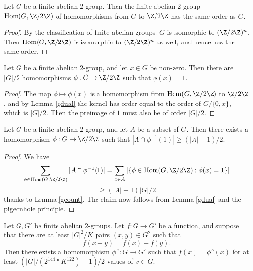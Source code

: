 \begin{lemma}[Duality]\label{gdual}\leanok Let $G$ be a finite abelian $2$-group.  Then the finite abelian $2$-group $\mathrm{Hom}(G,\Z/2\Z)$ of homomorphisms from $G$ to $\Z/2\Z$ has the same order as $G$.
\end{lemma}

\begin{proof}\leanok By the classification of finite abelian groups, $G$ is isomorphic to $(\Z/2\Z)^n$.  Then $\mathrm{Hom}(G,\Z/2\Z)$ is isomorphic to $(\Z/2\Z)^n$ as well, and hence has the same order.
\end{proof}

\begin{lemma}[Counting]\label{gcount}\leanok Let $G$ be a finite abelian $2$-group, and let $x \in G$ be non-zero.  Then there are $|G|/2$ homomorphisms $\phi: G \to \Z/2\Z$ such that $\phi(x) = 1$.
\end{lemma}

\begin{proof} \leanok The map $\phi \mapsto \phi(x)$ is a homomorphism from $\mathrm{Hom}(G,\Z/2\Z)$ to $\Z/2\Z$, and by Lemma \ref{gdual} the kernel has order equal to the order of $G / \{0,x\}$, which is $|G|/2$.  Then the preimage of $1$ must also be of order $|G|/2$.
\end{proof}

\begin{lemma}[Slicing]\label{gslice}\leanok  Let $G$ be a finite abelian $2$-group, and let $A$ be a subset of $G$.  Then there exists a homomorphism $\phi: G \to \Z/2\Z$ such that $|A \cap \phi^{-1}(1)| \geq (|A|-1)/2$.
\end{lemma}

\begin{proof}\leanok  We have
  $$ \sum_{\phi \in \mathrm{Hom}(G,\Z/2\Z)} |A \cap \phi^{-1}(1)| = \sum_{x \in A} |\{ \phi \in \mathrm{Hom}(G,\Z/2\Z): \phi(x) = 1 \}|$$
  $$ \geq (|A|-1) |G|/2$$
  thanks to Lemma \ref{gcount}. The claim now follows from Lemma \ref{gdual} and the pigeonhole principle.
\end{proof}

\begin{corollary}\label{approx-hom-pfr-no-const}\leanok Let $G,G'$ be finite abelian $2$-groups.
  Let $f: G \to G'$ be a function, and suppose that there are at least $|G|^2 / K$ pairs $(x,y) \in G^2$ such that
$$ f(x+y) = f(x) + f(y).$$
Then there exists a homomorphism $\phi'': G \to G'$
such that $f(x) = \phi''(x)$ for at least $(|G| / (2 ^ {144} * K ^ {122}) - 1)/2$ values of $x \in G$.
\end{corollary}

